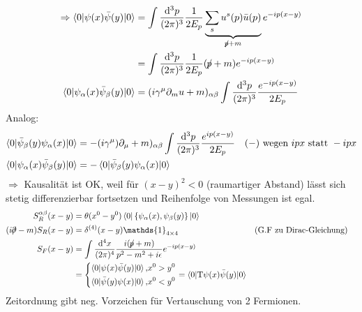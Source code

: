 	\begin{align*}
		\Rightarrow \braket{0 | \psi(x) \bar{\psi}(y) | 0} &= 
		\int \frac{\diff^3 p}{(2\pi)^3} \frac{1}{2 E_p} 
		\underbrace{\sum_s u^s(p) \bar{u}(p)}_{\mathclap{\durch{p} + m}} e^{-ip(x -y)} \\
		&= \int \frac{\diff^3 p}{(2 \pi)^3} \frac{1}{2 E_p} (\durch{p} + m) e^{-ip(x -y)} \\
		\braket{0 | \psi_\alpha(x) \bar{\psi}_\beta(y) | 0} &= 
		(i\gamma^\mu \partial_mu + m)_{\alpha \beta} 
		\int \frac{\diff^3 p}{ (2 \pi)^3} \frac{e^{-ip(x-y)}}{2 E_p}
	\end{align*}
Analog:
	\begin{align*}
		\braket{0 | \bar{\psi}_\beta(y) \psi_\alpha(x) | 0} &= 
		- (i \gamma^\mu) \partial_\mu + m)_{\alpha \beta} 
		\int \frac{\mathrm{d}^3 p}{(2\pi)^3} \frac{e^{ip(x-y)}}{2 E_p} &
		&(-) \text{ wegen }ipx \text{ statt }-ipx\\
		\braket{0 | \psi_\alpha(x) \bar{\psi}_\beta(y) | 0} &=
		- \braket{0 | \bar{\psi}_\beta(y) \psi_\alpha(x) | 0}
	\end{align*}
$\Rightarrow$ Kausalität ist OK, weil für $(x-y)^2 < 0$ (raumartiger Abstand) lässt sich stetig differenzierbar fortsetzen und Reihenfolge von Messungen ist egal. 
	\begin{align*}
		S_R^{\alpha\beta} (x-y) &= \theta(x^0 - y^0) 
		\braket{0 | \left\{\psi_\alpha(x) , \psi_\beta(y)\right\} | 0} \\
		(i \durch{\partial} - m) S_R(x - y) &= 
		\delta^{(4)} (x -y) \mathds{1}_{4 \times 4} & &(\text{G.F zu Dirac-Gleichung}) \\
		S_F(x-y) &= \int \frac{\diff^4 x}{(2\pi)^4} \frac{i(\durch{p} + m)}{p^2 -m^2 +i\epsilon} e^{-ip (x -y)} \\
		&=
		\left\{
			\begin{aligned}
				\braket{0 | \psi(x) \bar{\psi}(y) | 0} ,& x^0 > y^0 \\
				\braket{0 | \bar{\psi}(y) \psi(x) | 0} ,& x^0 < y^0
			\end{aligned}
		\right. 
		= \braket{0 | \mathrm{T} \psi(x) \bar{\psi}(y) | 0}
	\end{align*}
Zeitordnung gibt neg. Vorzeichen für Vertauschung von 2 Fermionen.
